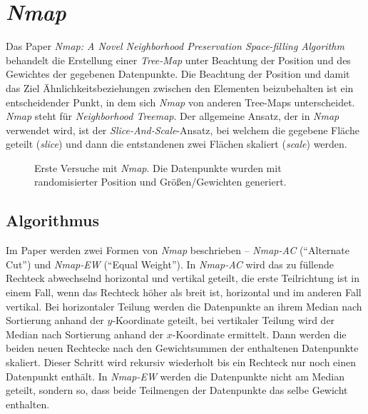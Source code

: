 \documentclass[12pt, ngerman, utf8]{article}
\begin{document}
\section{\textit{Nmap}}
Das Paper \textit{Nmap: A Novel Neighborhood Preservation Space-filling Algorithm}\cite{nmap} behandelt die Erstellung einer \emph{Tree-Map} unter Beachtung der Position und des Gewichtes der gegebenen Datenpunkte.
Die Beachtung der Position und damit das Ziel Ähnlichkeitsbeziehungen zwischen den Elementen beizubehalten ist ein entscheidender Punkt, in dem sich \textit{Nmap} von anderen Tree-Maps unterscheidet.
\textit{Nmap} steht für \textit{Neighborhood Treemap}. Der allgemeine Ansatz, der in \textit{Nmap} verwendet wird, ist der \textit{Slice-And-Scale}-Ansatz, bei welchem die gegebene Fläche geteilt (\textit{slice}) und dann die entstandenen zwei Flächen skaliert (\textit{scale}) werden. 

\begin{figure}[h]
    \noindent
    \caption{Erste Versuche mit \emph{Nmap}. Die Datenpunkte wurden mit randomisierter Position und Größen/Gewichten generiert.}
    \label{fig:nmap-one}
\end{figure}

\subsection{Algorithmus}
Im Paper \cite{nmap} werden zwei Formen von \textit{Nmap} beschrieben -- \textit{Nmap-AC} (``Alternate Cut'') und \textit{Nmap-EW} (``Equal Weight'').
In \textit{Nmap-AC} wird das zu füllende Rechteck abwechselnd horizontal und vertikal geteilt, die erste Teilrichtung ist in einem Fall, wenn das Rechteck höher als breit ist, horizontal und im anderen Fall vertikal. Bei horizontaler Teilung werden die Datenpunkte an ihrem Median nach Sortierung anhand der $y$-Koordinate geteilt, bei vertikaler Teilung wird der Median nach Sortierung anhand der $x$-Koordinate ermittelt. Dann werden die beiden neuen Rechtecke nach den Gewichtsummen der enthaltenen Datenpunkte skaliert. Dieser Schritt wird rekursiv wiederholt bis ein Rechteck nur noch einen Datenpunkt enthält. In \textit{Nmap-EW} werden die Datenpunkte nicht am Median geteilt, sondern so, dass beide Teilmengen der Datenpunkte das selbe Gewicht enthalten.
\end{document}
